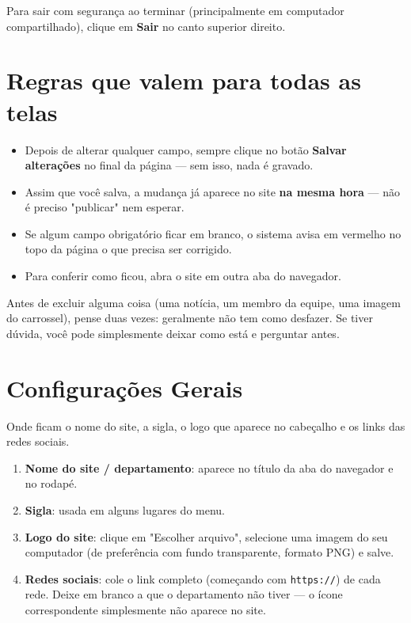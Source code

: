 \documentclass[11pt,a4paper]{article}
\begin{document}
Para sair com segurança ao terminar (principalmente em computador compartilhado), clique em
\textbf{Sair} no canto superior direito.

\section{Regras que valem para todas as telas}

\begin{itemize}[leftmargin=2em]
    \item Depois de alterar qualquer campo, sempre clique no botão \textbf{Salvar alterações}
          no final da página — sem isso, nada é gravado.
    \item Assim que você salva, a mudança já aparece no site \textbf{na mesma hora} — não é
          preciso "publicar" nem esperar.
    \item Se algum campo obrigatório ficar em branco, o sistema avisa em vermelho no topo da
          página o que precisa ser corrigido.
    \item Para conferir como ficou, abra o site em outra aba do navegador.
\end{itemize}

\begin{dica}
Antes de excluir alguma coisa (uma notícia, um membro da equipe, uma imagem do carrossel),
pense duas vezes: geralmente não tem como desfazer. Se tiver dúvida, você pode simplesmente
deixar como está e perguntar antes.
\end{dica}

\section{Configurações Gerais}

Onde ficam o nome do site, a sigla, o logo que aparece no cabeçalho e os links das redes
sociais.

\begin{enumerate}[leftmargin=2em]
    \item \textbf{Nome do site / departamento}: aparece no título da aba do navegador e no
          rodapé.
    \item \textbf{Sigla}: usada em alguns lugares do menu.
    \item \textbf{Logo do site}: clique em "Escolher arquivo", selecione uma imagem do seu
          computador (de preferência com fundo transparente, formato PNG) e salve.
    \item \textbf{Redes sociais}: cole o link completo (começando com \texttt{https://}) de
          cada rede. Deixe em branco a que o departamento não tiver — o ícone correspondente
          simplesmente não aparece no site.
\end{enumerate}
\end{document}
